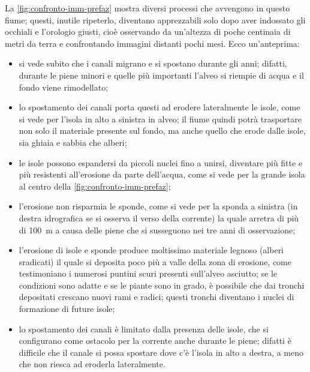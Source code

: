 \medskip
La \cref{fig:confronto-imm-prefaz} mostra diversi processi che avvengono in questo fiume; questi, inutile ripeterlo, diventano apprezzabili solo dopo aver indossato gli occhiali e l'orologio giusti, cioè osservando da un'altezza di poche centinaia di metri da terra e confrontando immagini distanti pochi mesi. Ecco un'anteprima:
\begin{itemize}
	\item si vede subito che i canali migrano e si spostano durante gli anni; 
		difatti, durante le piene minori e quelle più importanti l'alveo si riempie di acqua e il fondo viene rimodellato;
	\item lo spostamento dei canali porta questi ad erodere lateralmente le isole, come si vede per l'isola in alto a sinistra in alveo; 
		il fiume quindi potrà trasportare non solo il materiale presente sul fondo, ma anche quello che erode dalle isole, sia ghiaia e sabbia che alberi;
	\item le isole possono espandersi da piccoli nuclei fino a unirsi, diventare più fitte e più resistenti all'erosione da parte dell'acqua, come si vede per la grande isola al centro della \cref{fig:confronto-imm-prefaz};
	\item l'erosione non risparmia le sponde, come si vede per la sponda a sinistra (in destra idrografica se si osserva il verso della corrente) la quale arretra di più di \SI{100}{\m} a causa delle piene che si susseguono nei tre anni di osservazione;
	\item l'erosione di isole e sponde produce moltissimo materiale legnoso (alberi sradicati) il quale si deposita poco più a valle della zona di erosione, come testimoniano i numerosi puntini scuri presenti sull'alveo asciutto; 
		se le condizioni sono adatte e se le piante sono in grado, è possibile che dai tronchi depositati crescano nuovi rami e radici; 
		questi tronchi diventano i nuclei di formazione di future isole;
	\item lo spostamento dei canali è limitato dalla presenza delle isole, che si configurano come ostacolo per la corrente anche durante le piene;
		difatti è difficile che il canale si possa spostare dove c'è l'isola in alto a destra, a meno che non riesca ad eroderla lateralmente.
\end{itemize}

